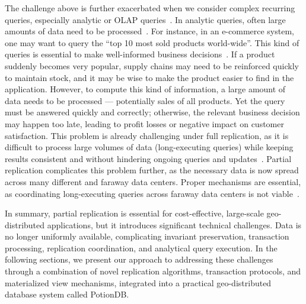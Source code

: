 The challenge above is further exacerbated when we consider complex recurring queries,
especially analytic or OLAP queries~\cite{dbtoaster,viewSelection,sioulas2023real}.
In analytic queries, often large amounts of data need to be processed~\cite{clickhouse, analyticdb}.
For instance, in an e-commerce system, one may want to query the ``top 10 most sold products world-wide''.
This kind of queries is essential to make well-informed business decisions~\cite{clickhouse, hadad}.
If a product suddenly becomes very popular, supply chains may need to be reinforced quickly to maintain stock, and it may
be wise to make the product easier to find in the application.
However, to compute this kind of information, a large amount of data needs to be processed --- potentially sales of all products.
Yet the query must be answered quickly and correctly; otherwise, the relevant business decision may happen too late,
leading to profit losses or negative impact on customer satisfaction.
This problem is already challenging under full replication, as it is difficult to process large volumes of data (long-executing
queries) while keeping results consistent and without hindering ongoing queries and updates~\cite{analyticdb}.
Partial replication complicates this problem further, as the necessary data is now spread across many different and faraway
data centers.
Proper mechanisms are essential, as coordinating long-executing queries across faraway data centers is not viable~\cite{clickhouse}.


In summary, partial replication is essential for cost-effective, large-scale geo-distributed applications, but it introduces significant technical challenges. Data is no longer uniformly available, complicating invariant preservation, transaction processing, replication coordination, and analytical query execution. In the following sections, we present our approach to addressing these challenges through a combination of novel replication algorithms, transaction protocols, and materialized view mechanisms, integrated into a practical geo-distributed database system called PotionDB.

